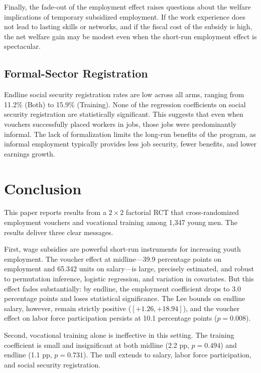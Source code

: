 \documentclass[12pt]{article}
\begin{document}
Finally, the fade-out of the employment effect raises questions about the welfare implications of temporary subsidized employment. If the work experience does not lead to lasting skills or networks, and if the fiscal cost of the subsidy is high, the net welfare gain may be modest even when the short-run employment effect is spectacular.

\subsection{Formal-Sector Registration}

Endline social security registration rates are low across all arms, ranging from 11.2\% (Both) to 15.9\% (Training). None of the regression coefficients on social security registration are statistically significant. This suggests that even when vouchers successfully placed workers in jobs, those jobs were predominantly informal. The lack of formalization limits the long-run benefits of the program, as informal employment typically provides less job security, fewer benefits, and lower earnings growth.

\section{Conclusion}\label{sec:conclusion}

This paper reports results from a $2 \times 2$ factorial RCT that cross-randomized employment vouchers and vocational training among 1,347 young men. The results deliver three clear messages.

First, wage subsidies are powerful short-run instruments for increasing youth employment. The voucher effect at midline---39.9 percentage points on employment and 65.342 units on salary---is large, precisely estimated, and robust to permutation inference, logistic regression, and variation in covariates. But this effect fades substantially: by endline, the employment coefficient drops to 3.0 percentage points and loses statistical significance. The Lee bounds on endline salary, however, remain strictly positive ($[+1.26, +18.94]$), and the voucher effect on labor force participation persists at 10.1 percentage points ($p = 0.008$).

Second, vocational training alone is ineffective in this setting. The training coefficient is small and insignificant at both midline (2.2 pp, $p = 0.494$) and endline (1.1 pp, $p = 0.731$). The null extends to salary, labor force participation, and social security registration.
\end{document}
